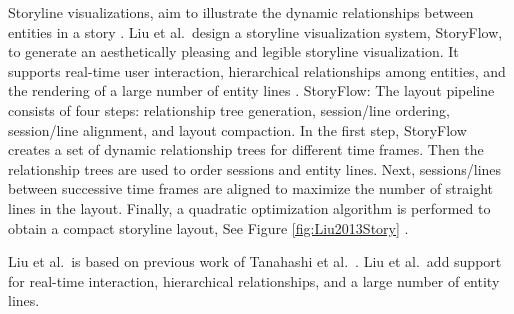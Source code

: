 \documentclass{egpubl}
\begin{document}
%
Storyline visualizations, aim to illustrate the dynamic relationships between entities in a story \cite{shixia}.
Liu et al.\ design a storyline visualization system, StoryFlow, to generate an aesthetically pleasing and legible storyline visualization. It supports real-time user interaction, hierarchical relationships among entities, and the rendering of a large number of entity lines \cite{shixia}.
StoryFlow: The layout pipeline consists of four steps: relationship tree generation, session/line ordering, session/line alignment, and layout compaction. In the first step, StoryFlow creates a set of dynamic relationship trees for different time frames. Then the relationship trees are used to order sessions and entity lines. Next, sessions/lines between successive time frames are aligned to maximize the number of straight lines in the layout. Finally, a quadratic optimization algorithm is performed to obtain a compact storyline layout, See Figure \ref{fig:Liu2013Story} \cite{shixia}.

Liu et al.\ is based on previous work of Tanahashi et al.\ \cite{Tanahashi}. Liu et al.\ add support for real-time interaction, hierarchical relationships, and a large number of entity lines. 
\end{document}

